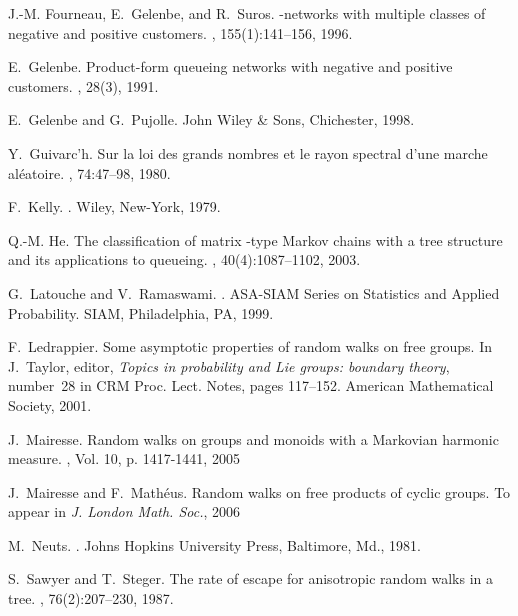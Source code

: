 \documentclass[11pt,a4paper]{article}
\theoremstyle{remark}
\begin{document}
\begin{thebibliography}{10}
J.-M. Fourneau, E.~Gelenbe, and R.~Suros.
\newblock {}-networks with multiple classes of negative and positive
  customers.
, 155(1):141--156, 1996.

E.~Gelenbe.
\newblock Product-form queueing networks with negative and positive customers.
, 28(3), 1991.

E.~Gelenbe and G.~Pujolle.
\newblock John Wiley \& Sons, Chichester, 1998.

Y.~Guivarc'h.
\newblock Sur la loi des grands nombres et le rayon spectral d'une marche
  al\'eatoire.
, 74:47--98, 1980.

F.~Kelly.
.
\newblock Wiley, New-York, 1979.

Q.-M. He.
\newblock The classification of matrix {}-type {M}arkov chains with a
  tree structure and its applications to queueing.
, 40(4):1087--1102, 2003.


G.~Latouche and V.~Ramaswami.
.
\newblock ASA-SIAM Series on Statistics and Applied Probability. SIAM,
  Philadelphia, PA, 1999.

F.~Ledrappier.
\newblock Some asymptotic properties of random walks on free groups.
\newblock In J.~Taylor, editor, {\em Topics in probability and Lie groups:
  boundary theory}, number~28 in CRM Proc. Lect. Notes, pages 117--152.
  American Mathematical Society, 2001.

J.~Mairesse.
\newblock Random walks on groups and monoids with a {M}arkovian harmonic
  measure.
, Vol. 10, p. 1417-1441, 2005

J.~Mairesse and F.~Math\'eus.
\newblock Random walks on free products of cyclic groups.
\newblock To appear in {\em J. London Math. Soc.}, 2006

M.~Neuts.
.
\newblock Johns Hopkins University Press, Baltimore, Md., 1981.

S.~Sawyer and T.~Steger.
\newblock The rate of escape for anisotropic random walks in a tree.
, 76(2):207--230, 1987.


\end{thebibliography}
\end{document}

